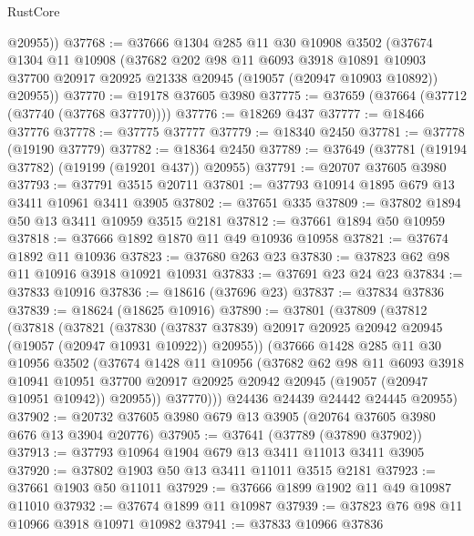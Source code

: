 \begin{lexlean}{RustCore}
\begin{coremodule}
        @20955))
@37768 := @37666
    @1304
    @285
    @11
    @30
    @10908
    @3502
    (@37674
      @1304
      @11
      @10908
      (@37682
        @202
        @98
        @11
        @6093
        @3918
        @10891
        @10903
        @37700
        @20917
        @20925
        @21338
        @20945
        (@19057 (@20947 @10903 @10892))
        @20955))
@37770 := @19178 @37605 @3980
@37775 := @37659 (@37664 (@37712 (@37740 (@37768 @37770))))
@37776 := @18269 @437
@37777 := @18466 @37776
@37778 := @37775 @37777
@37779 := @18340 @2450
@37781 := @37778 (@19190 @37779)
@37782 := @18364 @2450
@37789 := @37649 (@37781 (@19194 @37782) (@19199 (@19201 @437)) @20955)
@37791 := @20707 @37605 @3980
@37793 := @37791 @3515 @20711
@37801 := @37793 @10914 @1895 @679 @13 @3411 @10961 @3411 @3905
@37802 := @37651 @335
@37809 := @37802 @1894 @50 @13 @3411 @10959 @3515 @2181
@37812 := @37661 @1894 @50 @10959
@37818 := @37666 @1892 @1870 @11 @49 @10936 @10958
@37821 := @37674 @1892 @11 @10936
@37823 := @37680 @263 @23
@37830 := @37823 @62 @98 @11 @10916 @3918 @10921 @10931
@37833 := @37691 @23 @24 @23
@37834 := @37833 @10916
@37836 := @18616 (@37696 @23)
@37837 := @37834 @37836
@37839 := @18624 (@18625 @10916)
@37890 := @37801
    (@37809
      (@37812
        (@37818
          (@37821
            (@37830
              (@37837 @37839)
              @20917
              @20925
              @20942
              @20945
              (@19057 (@20947 @10931 @10922))
              @20955))
          (@37666
            @1428
            @285
            @11
            @30
            @10956
            @3502
            (@37674
              @1428
              @11
              @10956
              (@37682
                @62
                @98
                @11
                @6093
                @3918
                @10941
                @10951
                @37700
                @20917
                @20925
                @20942
                @20945
                (@19057 (@20947 @10951 @10942))
                @20955))
            @37770)))
      @24436
      @24439
      @24442
      @24445
      @20955)
@37902 := @20732 @37605 @3980 @679 @13 @3905 (@20764 @37605 @3980 @676 @13 @3904 @20776)
@37905 := @37641 (@37789 (@37890 @37902))
@37913 := @37793 @10964 @1904 @679 @13 @3411 @11013 @3411 @3905
@37920 := @37802 @1903 @50 @13 @3411 @11011 @3515 @2181
@37923 := @37661 @1903 @50 @11011
@37929 := @37666 @1899 @1902 @11 @49 @10987 @11010
@37932 := @37674 @1899 @11 @10987
@37939 := @37823 @76 @98 @11 @10966 @3918 @10971 @10982
@37941 := @37833 @10966 @37836

\end{coremodule}
\end{lexlean}
